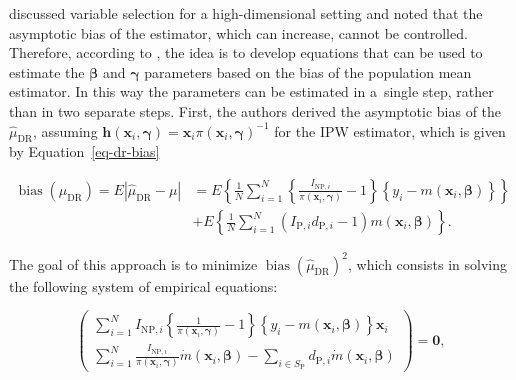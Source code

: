 \documentclass[
]{jss}
\begin{document}
\citet{yang_doubly_2020} discussed variable selection for a
high-dimensional setting and noted that the asymptotic bias of the
estimator, which can increase, cannot be controlled. Therefore,
according to \citet{yang_doubly_2020}, the idea is to develop equations
that can be used to estimate the \(\boldsymbol{\beta}\) and
\(\boldsymbol{\gamma}\) parameters based on the bias of the population
mean estimator. In this way the parameters can be estimated in a~single
step, rather than in two separate steps. First, the authors derived the
asymptotic bias of the \(\hat{\mu}_{\text{DR}}\), assuming
\(\boldsymbol{h}(\boldsymbol{x}_i, \boldsymbol{\gamma})=\boldsymbol{x}_i\pi(\boldsymbol{x}_i, \boldsymbol{\gamma})^{-1}\)
for the IPW estimator, which is given by Equation~\ref{eq-dr-bias}

\begin{equation}
\begin{aligned}
\operatorname{bias}\left(\hat{\mu}_{\text{DR}}\right) = E|\hat{\mu}_{\text{DR}}-\mu| &=
E\left\{\frac{1}{N} \sum_{i=1}^N\left\{\frac{I_{\text{NP},i}}{\pi\left(\boldsymbol{x}_i, \boldsymbol{\gamma}\right)} - 1\right\}\left\{y_i-m\left(\boldsymbol{x}_i, \boldsymbol{\beta}\right)\right\} \right\}\\
& + E\left\{\frac{1}{N} \sum_{i=1}^N\left(I_{\text{P},i} d_{\text{P},i}-1\right) m\left(\boldsymbol{x}_i, \boldsymbol{\beta}\right)\right\}.
\end{aligned}
\label{eq-dr-bias}
\end{equation}

The goal of this approach is to minimize
\(\operatorname{bias}\left(\hat{\mu}_{\text{DR}}\right)^2\), which
consists in solving the following system of empirical equations:

\begin{equation}
\left(\begin{array}{c}
\sum_{i=1}^N I_{\text{NP},i}\left\{\frac{1}{\pi\left(\boldsymbol{x}_i, \boldsymbol{\gamma}\right)}-1\right\}\left\{y_i-m\left(\boldsymbol{x}_i, \boldsymbol{\beta}\right)\right\} \boldsymbol{x}_i \\
\sum_{i=1}^N \frac{I_{\text{NP},i}}{\pi\left(\boldsymbol{x}_i, \boldsymbol{\gamma}\right)} \dot{m}\left(\boldsymbol{x}_i, \boldsymbol{\beta}\right) -\sum_{i \in S_{\text{P}}} d_{\text{P},i} \dot{m}\left(\boldsymbol{x}_i, \boldsymbol{\beta}\right)
\end{array}\right) = \boldsymbol{0},
\label{eq-bias-min}
\end{equation}
\end{document}
